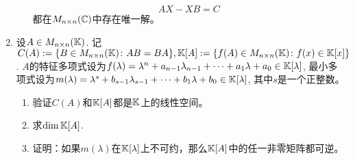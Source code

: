 \begin{enumerate}
\begin{enumerate}
\begin{equation*}
            AX-XB=C
        \end{equation*}都在$M_{n\times n}(\mathbb{C})$中存在唯一解。
    \end{enumerate}
    \item 设$A\in M_{n\times n}(\mathbb K)$. 记$C(A):=\{B\in M_{n\times n}(\mathbb K)\colon AB=BA\},\mathbb K[A]:=\{f(A)\in M_{n\times n}(\mathbb K)\colon \allowbreak f(x)\in\mathbb K[x]\}$. $A$的特征多项式设为$f(\lambda)=\lambda^n+a_{n-1}\lambda_{n-1}+\dots+a_1\lambda+a_0\in\mathbb K[\lambda]$, 最小多项式设为$m(\lambda)=\lambda^s+b_{s-1}\lambda_{s-1}+\dots+b_1\lambda+b_0\in\mathbb K[\lambda]$, 其中$s$是一个正整数。
    \begin{enumerate}
        \item 验证$C(A)$和$\mathbb K[A]$都是$\mathbb K$上的线性空间。
        \item 求$\dim \mathbb K[A]$.
        \item 证明：如果$m(\lambda)$在$\mathbb K[\lambda]$上不可约，那么$\mathbb K[A]$中的任一非零矩阵都可逆。
    \end{enumerate}
\end{enumerate}